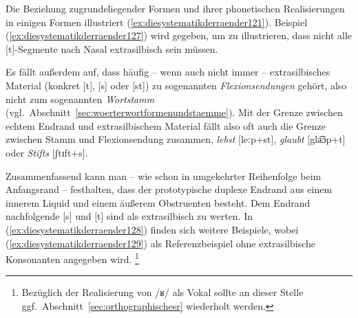 Die Beziehung zugrundeliegender Formen und ihrer phonetischen Realisierungen in einigen Formen illustriert (\ref{ex:diesystematikderraender121}).
Beispiel (\ref{ex:diesystematikderraender127}) wird gegeben, um zu illustrieren, dass nicht alle [t]-Segmente nach Nasal extrasilbisch sein müssen.

\begin{exe}
  \ex \label{ex:diesystematikderraender121}
  \begin{xlist}
  \end{xlist}
\end{exe}

Es fällt außerdem auf, dass häufig -- wenn auch nicht immer -- extrasilbisches Material (konkret [t], [s] oder [st]) zu sogenannten \textit{Flexionsendungen} gehört, also nicht zum sogenannten \textit{Wortstamm} (vgl.\ Abschnitt~\ref{sec:woerterwortformenundstaemme}).
Mit der Grenze zwischen echtem Endrand und extrasilbischem Material fällt also oft auch die Grenze zwischen Stamm und Flexionsendung zusammen, \zB \textit{lebst} [leːp+st], \textit{glaubt} [gla͡ɔp+t] oder \textit{Stifts} [ʃtɪft+s].

Zusammenfassend kann man -- wie schon in umgekehrter Reihenfolge beim Anfangsrand -- festhalten, dass der prototypische duplexe Endrand aus einem innerem Liquid und einem äußerem Obstruenten besteht.
Dem Endrand nachfolgende [s] und [t] sind als extrasilbisch zu werten.
In (\ref{ex:diesystematikderraender128}) finden sich weitere Beispiele, wobei (\ref{ex:diesystematikderraender129}) als Referenzbeispiel ohne extrasilbische Konsonanten angegeben wird.%
\footnote{Bezüglich der Realisierung von /ʁ/ als Vokal sollte an dieser Stelle ggf.\ Abschnitt~\ref{sec:orthographischesr} wiederholt werden.}

\begin{exe}
  \ex \label{ex:diesystematikderraender128}
  \begin{xlist}
  \end{xlist}
\end{exe}

